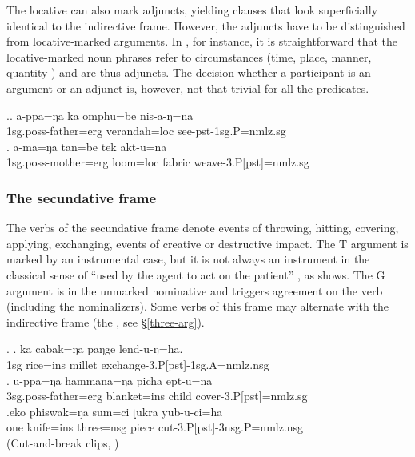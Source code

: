 The locative can also mark adjuncts, yielding clauses that look superficially identical to the indirective frame. However, the adjuncts have to be distinguished from locative-marked arguments. In \Next, for instance, it is straightforward that the locative-marked noun phrases refer to  circumstances (time, place, manner, quantity \citep[108]{Tesniere1959Elements}) and are thus adjuncts. The decision whether a participant is an argument or an adjunct is, however, not that trivial for all the predicates.

\ex.\ag. a-ppa=ŋa ka omphu=be nis-a-ŋ=na \\
{\sc 1sg.poss-}father{\sc =erg}  verandah{\sc =loc} see{\sc -pst-1sg.P=nmlz.sg}\\
\bg. a-ma=ŋa tan=be tek akt-u=na\\
{\sc 1sg.poss-}mother{\sc =erg} loom{\sc =loc} fabric weave{\sc -3.P[pst]=nmlz.sg}\\
 
\subsubsection{The secundative frame}


\noindent
The verbs of the secundative frame denote events of throwing, hitting, covering, applying, exchanging, events of creative or destructive impact. The T argument is marked by an instrumental case, but it is not always an instrument in the classical sense of “used by the agent to act on the patient” \citep{Andrews1985The-major}, as \Next[a] shows. The G argument is  in the unmarked nominative and triggers agreement on the verb (including the nominalizers). Some verbs of this frame may alternate with the indirective frame (the , see §\ref{three-arg}).

\ex. \ag. ka cabak=ŋa paŋge lend-u-ŋ=ha.\\
		1sg rice{\sc =ins} millet exchange-{\sc 3.P[pst]-1sg.A=nmlz.nsg}	\\
	\bg. u-ppa=ŋa hammana=ŋa picha ept-u=na\\
	{\sc 3sg.poss-}father{\sc =erg}  blanket{\sc =ins} child cover{\sc -3.P[pst]=nmlz.sg}\\
\bg.eko phiswak=ŋa sum=ci ʈukra yub-u-ci=ha\\
one knife{\sc =ins} three{\sc =nsg} piece cut{\sc -3.P[pst]-3nsg.P=nmlz.nsg}\\
 (Cut-and-break clips, \citet{Bohnemeyeretal2010_cut})

